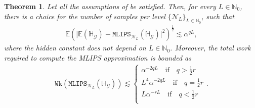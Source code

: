 \documentclass{article}
\newtheorem{theorem}{Theorem}
\newcommand{\cG}{\mathcal{G}}
\newcommand{\cN}{\mathcal{N}}
\newcommand{\IE}{\mathbb{E}}
\newcommand{\IH}{\mathbb{H}}
\newcommand{\IN}{\mathbb{N}}
\newcommand{\mlmk}[2]{\mathtt{MLIPS}_{#1}{\left(#2\right)}}
\newcommand{\work}[1]{\mathtt{Wk}\!\left(#1\right)}
\theoremstyle{definition}
\begin{document}
\begin{theorem}
  \label{thm:main}
  Let all the assumptions of  be satisfied. Then, for every $L\in\IN_0$, there is a choice
  for the number of samples per level $\{\cN_L\}_{L\in\IN_0}$, such that
  \begin{align*}
    \IE\left(\vert\IE(\IH_{\cG})-\mlmk{\cN_L}{\IH_{\cG}}\vert^2\right)^{\frac{1}{2}}\lesssim\alpha^{qL},
  \end{align*}
  where the hidden constant does not depend on $L\in\IN_0$. Moreover, the total work required to compute the MLIPS approximation is bounded as
  \begin{align*}
    \work{\mlmk{\cN_L}{\IH_\cG}}\lesssim\begin{cases}
      \alpha^{-2qL}\quad\text{if}\quad q>\frac{1}{2}r\\
      L^4\alpha^{-2qL}\quad\text{if}\quad q=\frac{1}{2}r\\
      L\alpha^{-rL}\quad\text{if}\quad q<\frac{1}{2}r\\
    \end{cases}.
  \end{align*}
  
\end{theorem}
\end{document}
